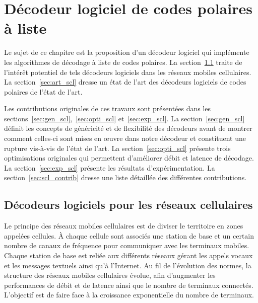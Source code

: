 {
\chapter{Décodeur logiciel de codes polaires à liste}
\label{chap:soft_scl}
}
{
\label{chap:soft_scl}
}



Le sujet de ce chapitre est la proposition d'un décodeur logiciel qui implémente les algorithmes de décodage à liste de codes polaires.
La section~\ref{sec:cellular} traite de l'intérêt potentiel de tels décodeurs logiciels dans les réseaux mobiles cellulaires. La section~\ref{sec:art_scl} dresse un état de l'art des décodeurs logiciels de codes polaires de l'état de l'art.

Les contributions originales de ces travaux sont présentées dans les sections~\ref{sec:gen_scl},~\ref{sec:opti_scl} et~\ref{sec:exp_scl}. La section~\ref{sec:gen_scl} définit les concepts de généricité et de flexibilité des décodeurs avant de montrer comment celles-ci sont mises en œuvre dans notre décodeur et constituent une rupture vis-à-vis de l'état de l'art. La section~\ref{sec:opti_scl} présente trois optimisations originales qui permettent d'améliorer débit et latence de décodage. La section~\ref{sec:exp_scl} présente les résultats d'expérimentation. La section~\ref{sec:scl_contrib} dresse une liste détaillée des différentes contributions.


{
  \vspace*{\fill}
  \minitocTITI
  \vspace*{\fill}
  \newpage
}
{
}

\section{Décodeurs logiciels pour les réseaux cellulaires}
\label{sec:cellular}

Le principe des réseaux mobiles cellulaires est de diviser le territoire en zones appelées cellules. \`A chaque cellule sont associés une station de base et un certain nombre de canaux de fréquence pour communiquer avec les terminaux mobiles. Chaque station de base est reliée aux différents réseaux gérant les appels vocaux et les messages textuels ainsi qu'à l'Internet. Au fil de l'évolution des normes, la structure des réseaux mobiles cellulaires évolue, afin d'augmenter les performances de débit et de latence ainsi que le nombre de terminaux connectés. L'objectif est de faire face à la croissance exponentielle du nombre de terminaux.

